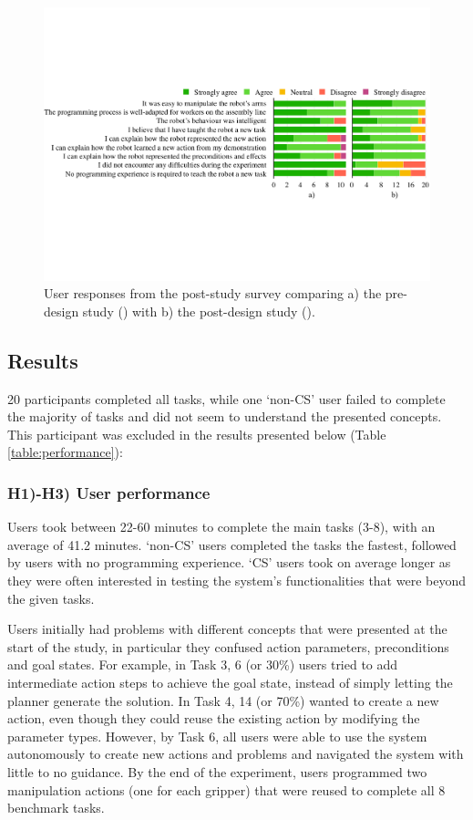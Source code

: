 \begin{figure}
	\includegraphics[width=0.98\linewidth]{Fig13.pdf}
	\caption{User responses from the post-study survey comparing a) the pre-design study () with b) the post-design study ().}
	\label{fig:exp1vsexp2-results}
\end{figure}

\subsection{Results}\label{sec:exp-results}
20 participants completed all tasks, while one `non-CS' user failed to complete the majority of tasks and did not seem to understand the presented concepts.
This participant was excluded in the results presented below (Table \ref{table:performance}):

\subsubsection*{\textbf{H1)-H3) User performance}} 
Users took between 22-60 minutes to complete the main tasks (3-8), with an average of 41.2 minutes.
`non-CS' users completed the tasks the fastest, followed by users with no programming experience.
`CS' users took on average longer as they were often interested in testing the system's functionalities that were beyond the given tasks.

Users initially had problems with different concepts that were presented at the start of the study, in particular they confused action parameters, preconditions and goal states.
For example, in Task 3, 6 (or 30\%) users tried to add intermediate action steps to achieve the goal state, instead of simply letting the planner generate the solution.
In Task 4, 14 (or 70\%) wanted to create a new action, even though they could reuse the existing action by modifying the parameter types.
However, by Task 6, all users were able to use the system autonomously to create new actions and problems and navigated the system with little to no guidance.
By the end of the experiment, users programmed two manipulation actions (one for each gripper) that were reused to complete all 8 benchmark tasks.


